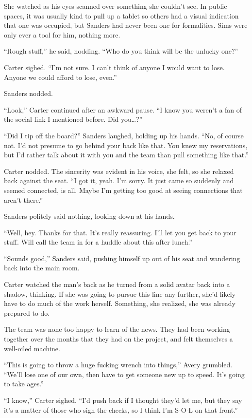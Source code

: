 She watched as his eyes scanned over something she couldn't see. In public spaces, it was usually kind to pull up a tablet so others had a visual indication that one was occupied, but Sanders had never been one for formalities. Sims were only ever a tool for him, nothing more.

``Rough stuff,'' he said, nodding. ``Who do you think will be the unlucky one?''

Carter sighed. ``I'm not sure. I can't think of anyone I would want to lose. Anyone we could afford to lose, even.''

Sanders nodded.

``Look,'' Carter continued after an awkward pause. ``I know you weren't a fan of the social link I mentioned before. Did you\ldots{}?''

``Did I tip off the board?'' Sanders laughed, holding up his hands. ``No, of course not. I'd not presume to go behind your back like that. You knew my reservations, but I'd rather talk about it with you and the team than pull something like that.''

Carter nodded. The sincerity was evident in his voice, she felt, so she relaxed back against the seat. ``I got it, yeah. I'm sorry. It just came so suddenly and seemed connected, is all. Maybe I'm getting too good at seeing connections that aren't there.''

Sanders politely said nothing, looking down at his hands.

``Well, hey. Thanks for that. It's really reassuring. I'll let you get back to your stuff. Will call the team in for a huddle about this after lunch.''

``Sounds good,'' Sanders said, pushing himself up out of his seat and wandering back into the main room.

Carter watched the man's back as he turned from a solid avatar back into a shadow, thinking. If she was going to pursue this line any further, she'd likely have to do much of the work herself. Something, she realized, she was already prepared to do.

The team was none too happy to learn of the news. They had been working together over the months that they had on the project, and felt themselves a well-oiled machine.

``This is going to throw a huge fucking wrench into things,'' Avery grumbled. ``We'll lose one of our own, then have to get someone new up to speed. It's going to take ages.''

``I know,'' Carter sighed. ``I'd push back if I thought they'd let me, but they say it's a matter of those who sign the checks, so I think I'm S-O-L on that front.''

